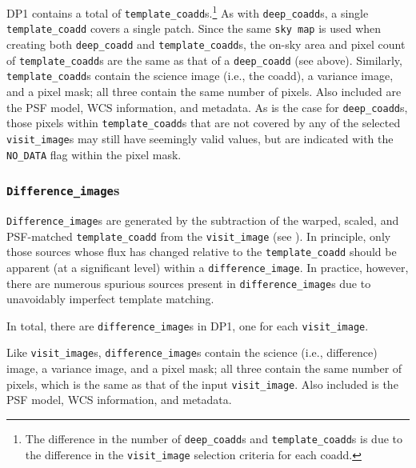 \gls{DP1} contains a total of \ntemplatecoadds \texttt{template\_coadd}s.\footnote{The difference in the number of \texttt{deep\_coadd}s and \texttt{template\_coadd}s is due to the difference in the \texttt{visit\_image} selection criteria for each coadd.}
As with \texttt{deep\_coadd}s, a single \texttt{template\_coadd} covers a single \gls{patch}.
Since the same \texttt{sky map} is used when creating both \texttt{deep\_coadd} and \texttt{template\_coadd}s, the on-sky area and pixel count of \texttt{template\_coadd}s are the same as that of a \texttt{deep\_coadd} (see above).
Similarly, \texttt{template\_coadd}s contain the science image (i.e., the coadd), a variance image, and a pixel mask; all three contain the same number of pixels.
Also included are the \gls{PSF} model, \gls{WCS} information, and \gls{metadata}.
As is the case for \texttt{deep\_coadd}s, those pixels within \texttt{template\_coadd}s that are not covered by any of the selected \texttt{visit\_image}s may still have seemingly valid values, but are indicated with the \texttt{NO\_DATA} flag within the pixel mask.

\subsubsection{\texttt{Difference\_image}s}
\texttt{Difference\_image}s \citep[][]{10.71929/rubin/2570312} are generated by the subtraction of the warped, scaled, and \gls{PSF}-matched \texttt{template\_coadd} from the \texttt{visit\_image} (see ). In principle, only those sources whose \gls{flux} has changed relative to the \texttt{template\_coadd} should be apparent (at a significant level) within a \texttt{difference\_image}. In practice, however, there are numerous spurious sources present in \texttt{difference\_image}s due to unavoidably imperfect template matching.

In total, there are \ndifferenceimages \texttt{difference\_image}s in \gls{DP1}, one for each \texttt{visit\_image}.

Like \texttt{visit\_image}s, \texttt{difference\_image}s contain the science (i.e., difference) image, a variance image, and a pixel mask; all three contain the same number of pixels, which is the same as that of the input \texttt{visit\_image}.
Also included is the \gls{PSF} model, \gls{WCS} information, and \gls{metadata}.

